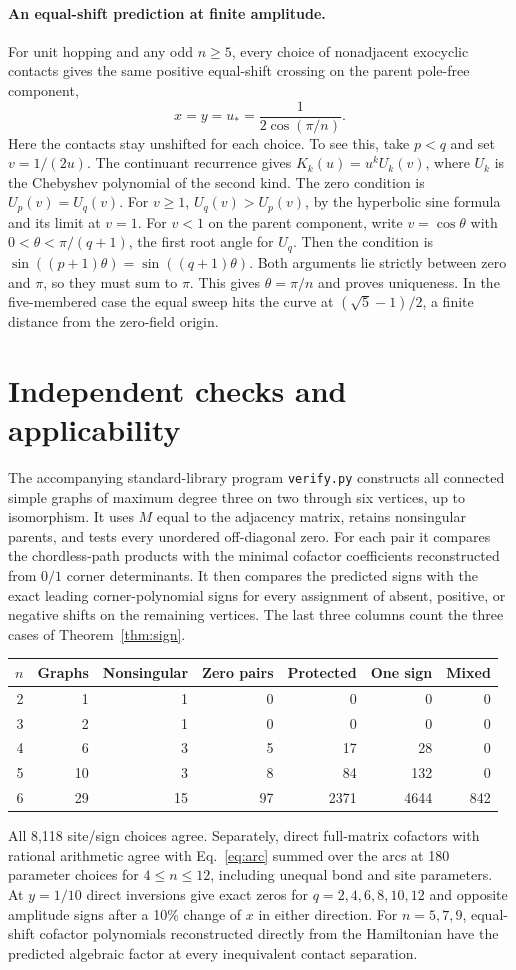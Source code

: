 \documentclass[11pt,a4paper]{article}
\begin{document}
\paragraph{An equal-shift prediction at finite amplitude.}
For unit hopping and any odd $n\ge5$, every choice of nonadjacent exocyclic contacts gives the same positive equal-shift crossing on the parent pole-free component,
\[
 x=y=u_*=\frac{1}{2\cos(\pi/n)} .
\]
Here the contacts stay unshifted for each choice. To see this, take $p<q$ and set $v=1/(2u)$. The continuant recurrence gives $K_k(u)=u^k U_k(v)$, where $U_k$ is the Chebyshev polynomial of the second kind. The zero condition is $U_p(v)=U_q(v)$. For $v\ge1$, $U_q(v)>U_p(v)$, by the hyperbolic sine formula and its limit at $v=1$. For $v<1$ on the parent component, write $v=\cos\theta$ with $0<\theta<\pi/(q+1)$, the first root angle for $U_q$. Then the condition is $\sin((p+1)\theta)=\sin((q+1)\theta)$. Both arguments lie strictly between zero and $\pi$, so they must sum to $\pi$. This gives $\theta=\pi/n$ and proves uniqueness. In the five-membered case the equal sweep hits the curve at $(\sqrt5-1)/2$, a finite distance from the zero-field origin.

\section{Independent checks and applicability}
The accompanying standard-library program \texttt{verify.py} constructs all connected simple graphs of maximum degree three on two through six vertices, up to isomorphism. It uses $M$ equal to the adjacency matrix, retains nonsingular parents, and tests every unordered off-diagonal zero. For each pair it compares the chordless-path products with the minimal cofactor coefficients reconstructed from $0/1$ corner determinants. It then compares the predicted signs with the exact leading corner-polynomial signs for every assignment of absent, positive, or negative shifts on the remaining vertices. The last three columns count the three cases of Theorem~\ref{thm:sign}.
\begin{center}
\begin{tabular}{rrrrrrr}
\toprule
$n$& Graphs & Nonsingular & Zero pairs & Protected & One sign & Mixed\\
\midrule
2&1&1&0&0&0&0\\
3&2&1&0&0&0&0\\
4&6&3&5&17&28&0\\
5&10&3&8&84&132&0\\
6&29&15&97&2371&4644&842\\
\bottomrule
\end{tabular}
\end{center}
All 8,118 site/sign choices agree. Separately, direct full-matrix cofactors with rational arithmetic agree with Eq.~\eqref{eq:arc} summed over the arcs at 180 parameter choices for $4\le n\le12$, including unequal bond and site parameters. At $y=1/10$ direct inversions give exact zeros for $q=2,4,6,8,10,12$ and opposite amplitude signs after a 10\% change of $x$ in either direction. For $n=5,7,9$, equal-shift cofactor polynomials reconstructed directly from the Hamiltonian have the predicted algebraic factor at every inequivalent contact separation.
\end{document}
